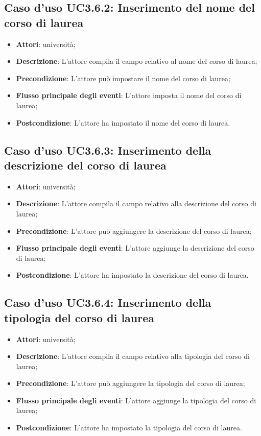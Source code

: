 \subsection{Caso d'uso \texorpdfstring{UC3.6.2}{UC3.6.2}: Inserimento del nome del corso di laurea}
\begin{itemize}
\item \textbf{Attori}: università;
\item \textbf{Descrizione}: L'attore compila il campo relativo al nome del corso di laurea;
\item \textbf{Precondizione}: L'attore può impostare il nome del corso di laurea;
\item \textbf{Flusso principale degli eventi}: L'attore imposta il nome del corso di laurea;
\item \textbf{Postcondizione}: L'attore ha impostato il nome del corso di laurea.
\end{itemize}
\subsection{Caso d'uso \texorpdfstring{UC3.6.3}{UC3.6.3}: Inserimento della descrizione del corso di laurea}
\begin{itemize}
\item \textbf{Attori}: università;
\item \textbf{Descrizione}: L'attore compila il campo relativo alla descrizione del corso di laurea;
\item \textbf{Precondizione}: L'attore può aggiungere la descrizione del corso di laurea;

\item \textbf{Flusso principale degli eventi}: L'attore aggiunge la descrizione del corso di laurea;
\item \textbf{Postcondizione}: L'attore ha impostato la descrizione del corso di laurea.
\end{itemize}
\subsection{Caso d'uso \texorpdfstring{UC3.6.4}{UC3.6.4}: Inserimento della tipologia del corso di laurea}
\begin{itemize}
\item \textbf{Attori}: università;
\item \textbf{Descrizione}: L'attore compila il campo relativo alla tipologia del corso di laurea;
\item \textbf{Precondizione}: L'attore può aggiungere la tipologia del corso di laurea;
\item \textbf{Flusso principale degli eventi}: L'attore aggiunge la tipologia del corso di laurea;
\item \textbf{Postcondizione}: L'attore ha impostato la tipologia del corso di laurea.
\end{itemize}
